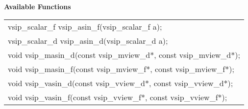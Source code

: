 \\\cvsiplh
\\\hspace*{.8cm} \vspace*{.1cm} \textbf{Available Functions}\\
\hspace*{1.1cm} {
\ttfamily
\begin{tabular}[H]{l}
vsip\_scalar\_f vsip\_asin\_f(vsip\_scalar\_f a);\\
vsip\_scalar\_d vsip\_asin\_d(vsip\_scalar\_d a);\\
void vsip\_masin\_d(const vsip\_mview\_d*, const vsip\_mview\_d*);\\
void vsip\_masin\_f(const vsip\_mview\_f*, const vsip\_mview\_f*);\\
void vsip\_vasin\_d(const vsip\_vview\_d*, const vsip\_vview\_d*);\\
void vsip\_vasin\_f(const vsip\_vview\_f*, const vsip\_vview\_f*);\\
\end{tabular}
}
\\\pyjvsiph
{}
